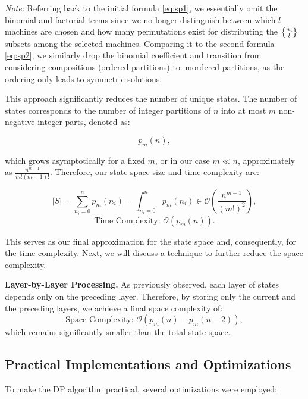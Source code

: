 \textit{Note:} Referring back to the initial formula \autoref{eq:sp1}, we essentially omit the binomial and factorial terms since we no longer distinguish between which $l$ machines are chosen and how many permutations exist for distributing the $\stirlingS{n_i}{l}$ subsets among the selected machines. Comparing it to the second formula \autoref{eq:sp2}, we similarly drop the binomial coefficient and transition from considering compositions (ordered partitions) to unordered partitions, as the ordering only leads to symmetric solutions.

This approach significantly reduces the number of unique states. The number of states corresponds to the number of integer partitions of $n$ into at most $m$ non-negative integer parts, denoted as:

\[
    p_m(n),
\]

which grows asymptotically for a fixed $m$, or in our case $m \ll n$, approximately as $\frac{n^{m-1}}{m!(m-1)!}$. Therefore, our state space size and time complexity are:

\begin{equation}
    |S| = \sum_{n_i=0}^n p_m(n_i) = \int_{n_i=0}^n p_m(n_i) \in \mathcal{O}\left( \frac{n^{m-1}}{(m!)^2} \right),
    \label{sss}
\end{equation}
\begin{equation}
    \text{Time Complexity: } \mathcal{O}\left( p_m(n) \right).
    \label{time-comp}
\end{equation}

This serves as our final approximation for the state space and, consequently, for the time complexity. Next, we will discuss a technique to further reduce the space complexity.

\textbf{Layer-by-Layer Processing.} As previously observed, each layer of states depends only on the preceding layer. Therefore, by storing only the current and the preceding layers, we achieve a final space complexity of:
\begin{equation}
    \text{Space Complexity: } \mathcal{O}\left( p_m(n) - p_m(n-2) \right),
    \label{space-comp}
\end{equation}
which remains significantly smaller than the total state space.

\subsection*{Practical Implementations and Optimizations}

To make the DP algorithm practical, several optimizations were employed:

